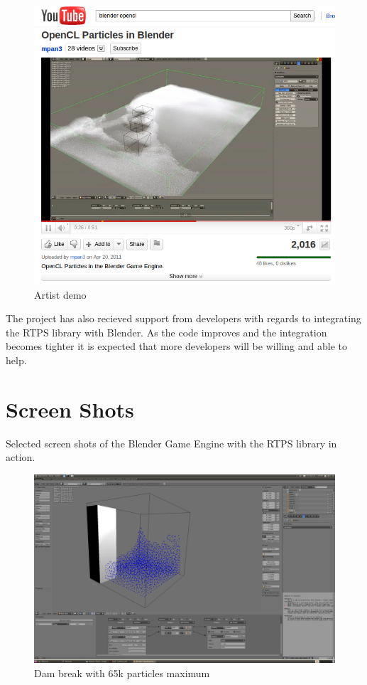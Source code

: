 \begin{figure}[!htc]
 		\centering
		\includegraphics[scale=0.5]{figures/youtube.png}
        \caption{ Artist demo }
		\label{fig:mpan}
\end{figure}

The project has also recieved support from developers with regards to
integrating the RTPS library with Blender. As the code improves and the
integration becomes tighter it is expected that more developers will be willing
and able to help.

\pagebreak
\clearpage

\section{Screen Shots}

Selected screen shots of the Blender Game Engine with the RTPS library in action.

\begin{figure}[!htc]
		\includegraphics[scale=0.17]{figures/dam_break.png}
        \caption{ Dam break with 65k particles maximum }
		\label{fig:dam_break}
\end{figure}

